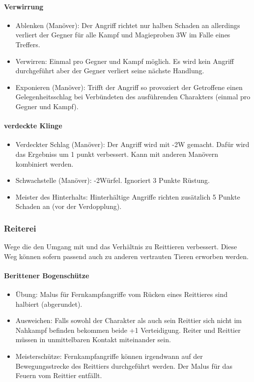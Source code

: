 \documentclass{article}
\begin{document}
\paragraph{Verwirrung}

\begin{itemize}
\item Ablenken (Manöver): Der Angriff richtet nur halben Schaden an allerdings verliert der Gegner für alle Kampf und Magieproben 3W im Falle eines Treffers.
\item Verwirren: Einmal pro Gegner und Kampf möglich. Es wird kein Angriff durchgeführt aber der Gegner verliert seine nächste Handlung.
\item Exponieren (Manöver): Trifft der Angriff so provoziert der Getroffene einen Gelegenheitsschlag bei Verbündeten des ausführenden Charakters (einmal pro Gegner und Kampf).
\end{itemize}

\paragraph{verdeckte Klinge}

\begin{itemize}
\item Verdeckter Schlag (Manöver): Der Angriff wird mit -2W gemacht. Dafür wird das Ergebniss um 1 punkt verbessert. Kann mit anderen Manövern kombiniert werden.
\item Schwachstelle (Manöver): -2Würfel. Ignoriert 3 Punkte Rüstung.
\item Meister des Hinterhalts: Hinterhältige Angriffe richten zusätzlich 5 Punkte Schaden an (vor der Verdopplung).
\end{itemize}

\subsubsection{Reiterei}

Wege die den Umgang mit und das Verhältnis zu Reittieren verbessert. Diese Weg können sofern passend auch zu anderen
vertrauten Tieren erworben werden.

\paragraph{Berittener Bogenschütze}

\begin{itemize}
\item Übung: Malus für Fernkampfangriffe vom Rücken eines Reittieres sind halbiert (abgerundet).
\item Ausweichen: Falls sowohl der Charakter als auch sein Reittier sich nicht im Nahkampf befinden bekommen beide +1 Verteidigung. Reiter und Reittier müssen in unmittelbaren Kontakt miteinander sein.
\item Meisterschütze: Fernkampfangriffe können irgendwann auf der Bewegungsstrecke des Reittiers durchgeführt werden. Der Malus für das Feuern vom Reittier entfällt.
\end{itemize}
\end{document}
